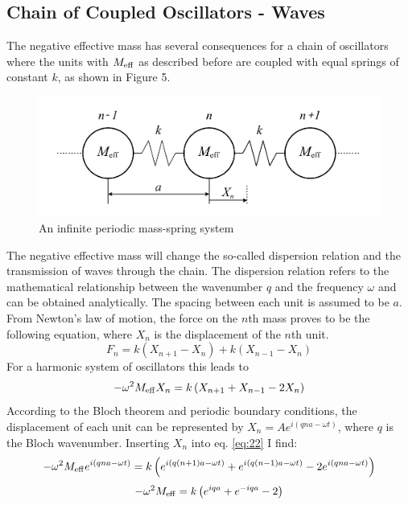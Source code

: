 \documentclass[12pt]{article}
\begin{document}
\subsection{Chain of Coupled Oscillators - Waves}\label{sec:coupled:waves}
The negative effective mass has several consequences for a chain of oscillators where the units with $M_{\rm eff}$ as described before are coupled with equal springs of constant $k$, as shown in Figure 5. 
\begin{figure}[hbt]
  \includegraphics[width=0.8\columnwidth]{chain_of_oscillators.pdf}
  \caption{An infinite periodic mass-spring system}
\end{figure}
The negative effective mass will change the so-called dispersion relation and the transmission of waves through the chain. The dispersion relation refers to the mathematical relationship between the wavenumber $q$ and the frequency $\omega$ and can be obtained analytically. The spacing between each unit is assumed to be $a$. From Newton's law of motion, the force on the $n$th mass proves to be the following equation, where $X_n$ is the displacement of the $n$th unit.
\begin{equation}\label{eq:21}
	F_{n} = k (X_{n+1} - X_n) + k(X_{n-1} - X_n)
\end{equation}
For a harmonic system of oscillators this leads to
\begin{equation}\label{eq:22}
-\omega^2 M_{\rm eff} X_n = k \left(X_{n+1} + X_{n-1} - 2X_n \right)	
\end{equation}
According to the Bloch theorem and periodic boundary conditions, the displacement of each unit can be represented by $X_n = Ae^{i(qna - \omega t)}$, where $q$ is the Bloch wavenumber.  Inserting $X_n$ into eq. \ref{eq:22} I find:
\begin{equation}\label{eq:23}
	-\omega^2 M_{\rm eff} e^{i(qna - \omega t)} = k\left(e^{i(q(n+1)a - \omega t)} + e^{i(q(n-1)a - \omega t)} - 2e^{i(qna - \omega t)}\right)	
\end{equation}
\begin{equation}\label{eq:24}
	-\omega^2 M_{\rm eff} = k\left(e^{iqa} + e^{-iqa} - 2\right)
\end{equation}
\end{document}
